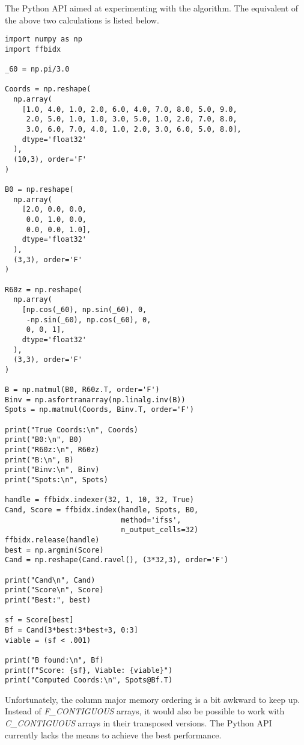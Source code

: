 \documentclass[a4paper,10pt]{article}
\begin{document}
The Python API aimed at experimenting with the algorithm. The equivalent of the above two calculations is listed below.
%
\begin{lstlisting}
import numpy as np
import ffbidx

_60 = np.pi/3.0

Coords = np.reshape(
  np.array(
    [1.0, 4.0, 1.0, 2.0, 6.0, 4.0, 7.0, 8.0, 5.0, 9.0,
     2.0, 5.0, 1.0, 1.0, 3.0, 5.0, 1.0, 2.0, 7.0, 8.0,
     3.0, 6.0, 7.0, 4.0, 1.0, 2.0, 3.0, 6.0, 5.0, 8.0],
    dtype='float32'
  ),
  (10,3), order='F'
)

B0 = np.reshape(
  np.array(
    [2.0, 0.0, 0.0,
     0.0, 1.0, 0.0,
     0.0, 0.0, 1.0],
    dtype='float32'
  ),
  (3,3), order='F'
)

R60z = np.reshape(
  np.array(
    [np.cos(_60), np.sin(_60), 0,
     -np.sin(_60), np.cos(_60), 0,
     0, 0, 1],
    dtype='float32'
  ),
  (3,3), order='F'
)

B = np.matmul(B0, R60z.T, order='F')
Binv = np.asfortranarray(np.linalg.inv(B))
Spots = np.matmul(Coords, Binv.T, order='F')

print("True Coords:\n", Coords)
print("B0:\n", B0)
print("R60z:\n", R60z)
print("B:\n", B)
print("Binv:\n", Binv)
print("Spots:\n", Spots)

handle = ffbidx.indexer(32, 1, 10, 32, True)
Cand, Score = ffbidx.index(handle, Spots, B0,
                           method='ifss',
                           n_output_cells=32)
ffbidx.release(handle)
best = np.argmin(Score)
Cand = np.reshape(Cand.ravel(), (3*32,3), order='F')

print("Cand\n", Cand)
print("Score\n", Score)
print("Best:", best)

sf = Score[best]
Bf = Cand[3*best:3*best+3, 0:3]
viable = (sf < .001)

print("B found:\n", Bf)
print(f"Score: {sf}, Viable: {viable}")
print("Computed Coords:\n", Spots@Bf.T)
\end{lstlisting}
%
Unfortunately, the column major memory ordering is a bit awkward to keep up. Instead of \emph{F\_CONTIGUOUS} arrays, it would also be possible to work with \emph{C\_CONTIGUOUS} arrays in their transposed versions. The Python API currently lacks the means to achieve the best performance.

\end{document}
